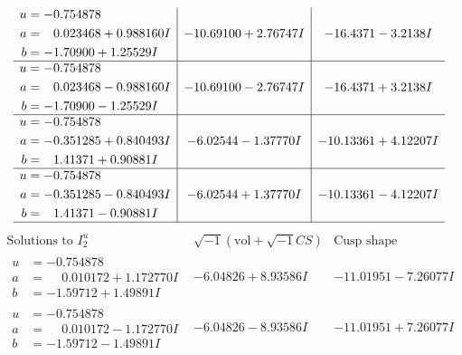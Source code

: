 \documentclass[1p]{elsarticle_modified}
\theoremstyle{definition}
\newcommand{\I}{\sqrt{-1}}
\begin{document}
$$\begin{array}{c|c|c}
\begin{aligned}
u &= -0.754878\phantom{ +0.000000I} \\
a &= \phantom{-}0.023468 + 0.988160 I \\
b &= -1.70900 + 1.25529 I\end{aligned}
 & -10.69100 + 2.76747 I & -16.4371 - 3.2138 I \\ \hline\begin{aligned}
u &= -0.754878\phantom{ +0.000000I} \\
a &= \phantom{-}0.023468 - 0.988160 I \\
b &= -1.70900 - 1.25529 I\end{aligned}
 & -10.69100 - 2.76747 I & -16.4371 + 3.2138 I \\ \hline\begin{aligned}
u &= -0.754878\phantom{ +0.000000I} \\
a &= -0.351285 + 0.840493 I \\
b &= \phantom{-}1.41371 + 0.90881 I\end{aligned}
 & -6.02544 - 1.37770 I & -10.13361 + 4.12207 I \\ \hline\begin{aligned}
u &= -0.754878\phantom{ +0.000000I} \\
a &= -0.351285 - 0.840493 I \\
b &= \phantom{-}1.41371 - 0.90881 I\end{aligned}
 & -6.02544 + 1.37770 I & -10.13361 - 4.12207 I\\
 \hline 
 \end{array}$$\newpage$$\begin{array}{c|c|c}  
\text{Solutions to }I^u_{2}& \I (\text{vol} + \sqrt{-1}CS) & \text{Cusp shape}\\
 \hline 
\begin{aligned}
u &= -0.754878\phantom{ +0.000000I} \\
a &= \phantom{-}0.010172 + 1.172770 I \\
b &= -1.59712 + 1.49891 I\end{aligned}
 & -6.04826 + 8.93586 I & -11.01951 - 7.26077 I \\ \hline\begin{aligned}
u &= -0.754878\phantom{ +0.000000I} \\
a &= \phantom{-}0.010172 - 1.172770 I \\
b &= -1.59712 - 1.49891 I\end{aligned}
 & -6.04826 - 8.93586 I & -11.01951 + 7.26077 I \\ \hline\begin{aligned}

\end{aligned}
\end{array}$$
\end{document}
